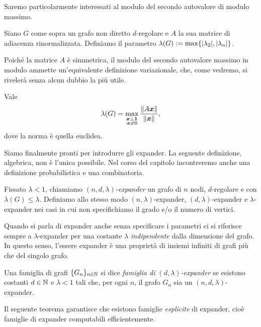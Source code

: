 Saremo particolarmente interessati al modulo del secondo autovalore di modulo
massimo.

\begin{definition}
	Siano $G$ come sopra un grafo non diretto $d$-regolare e $A$ la sua matrice
	di adiacenza rinormalizzata. Definiamo il parametro
	$\lambda(G) := \max\{\lvert \lambda_2 \rvert, \lvert \lambda_n \rvert\}$.
\end{definition}

Poiché la matrice $A$ è simmetrica, il modulo del secondo autovalore massimo
in modulo ammette un'equivalente definizione variazionale, che, come vedremo,
si rivelerà senza alcun dubbio la più utile.

\begin{proposition}
	Vale
	\[
		\lambda(G) =
		\max_{\substack{\bm{x} \perp \bm{1} \\ \bm{x} \neq 0}}
		\frac{\lVert A \bm{x}\rVert}{\lVert\bm{x}\rVert},
	\]
	dove la norma è quella euclidea.
\end{proposition}

Siamo finalmente pronti per introdurre gli expander. La seguente definizione,
algebrica, non è l'unica possibile. Nel corso del capitolo incontreremo anche
una definizione probabilistica e una combinatoria.

\begin{definition}
	Fissato $\lambda < 1$, chiamiamo \emph{$(n, d, \lambda)$-expander} un grafo
	di $n$ nodi, $d$-regolare e con $\lambda(G) \le \lambda$.
	Definiamo allo stesso modo $(n, \lambda)$-expander, $(d, \lambda)$-expander
	e $\lambda$-expander nei casi in cui non specifichiamo il grado e/o il
	numero di vertici.
\end{definition}

Quando si parla di expander anche senza specificare i parametri ci si riferisce
sempre a $\lambda$-expander per una costante $\lambda$ \emph{indipendente} dalla
dimensione del grafo.
In questo senso, l'essere expander è una proprietà di insiemi infiniti di grafi
più che del singolo grafo.

\begin{definition}
	Una famiglia di grafi $\{G_n\}_{n \in \mathbb{N}}$ si dice \emph{famiglia di
	$(d, \lambda)$-expander} se esistono costanti $d \in \mathbb{N}$ e $\lambda < 1$
	tali che, per ogni $n$, il grafo $G_n$ sia un $(n, d, \lambda)$-expander.
\end{definition}

Il seguente teorema garantisce che esistono famiglie \emph{esplicite} di
expander, cioè famiglie di expander computabili efficientemente.

